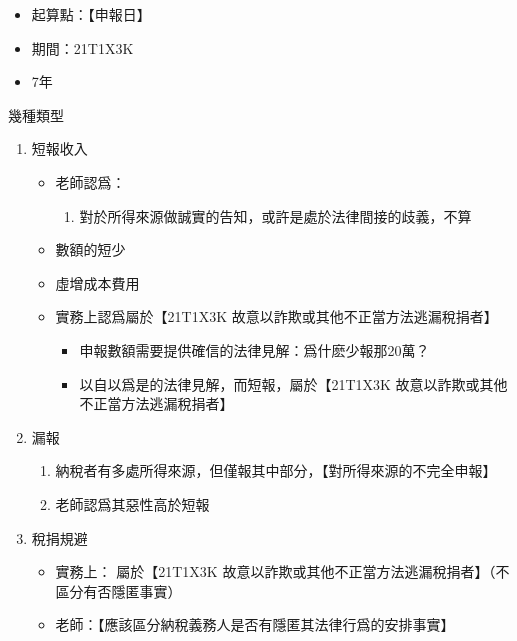 \documentclass[]{ctexbook}
\providecommand{\tightlist}{%
  \setlength{\itemsep}{0pt}\setlength{\parskip}{0pt}}
\begin{document}
\begin{itemize}
  \begin{itemize}
  \tightlist
  \item
    起算點：【申報日】
  \item
    期間：21T1X3K
  \item
    7年
  \end{itemize}
\end{itemize}

幾種類型

\begin{enumerate}
\def\labelenumi{\arabic{enumi}.}
\tightlist
\item
  短報收入

  \begin{itemize}
  \tightlist
  \item
    老師認爲：

    \begin{enumerate}
    \def\labelenumii{\arabic{enumii}.}
    \tightlist
    \item
      對於所得來源做誠實的告知，或許是處於法律間接的歧義，不算
    \end{enumerate}
  \item
    數額的短少
  \item
    虛增成本費用
  \item
    實務上認爲屬於【21T1X3K 故意以詐欺或其他不正當方法逃漏稅捐者】

    \begin{itemize}
    \tightlist
    \item
      申報數額需要提供確信的法律見解：爲什麽少報那20萬？
    \item
      以自以爲是的法律見解，而短報，屬於【21T1X3K 故意以詐欺或其他不正當方法逃漏稅捐者】
    \end{itemize}
  \end{itemize}
\item
  漏報

  \begin{enumerate}
  \def\labelenumii{\arabic{enumii}.}
  \tightlist
  \item
    納稅者有多處所得來源，但僅報其中部分，【對所得來源的不完全申報】
  \item
    老師認爲其惡性高於短報
  \end{enumerate}
\item
  稅捐規避

  \begin{itemize}
  \tightlist
  \item
    實務上： 屬於【21T1X3K 故意以詐欺或其他不正當方法逃漏稅捐者】（不區分有否隱匿事實）
  \item
    老師：【應該區分納稅義務人是否有隱匿其法律行爲的安排事實】


\end{itemize}
\end{enumerate}
\end{document}

